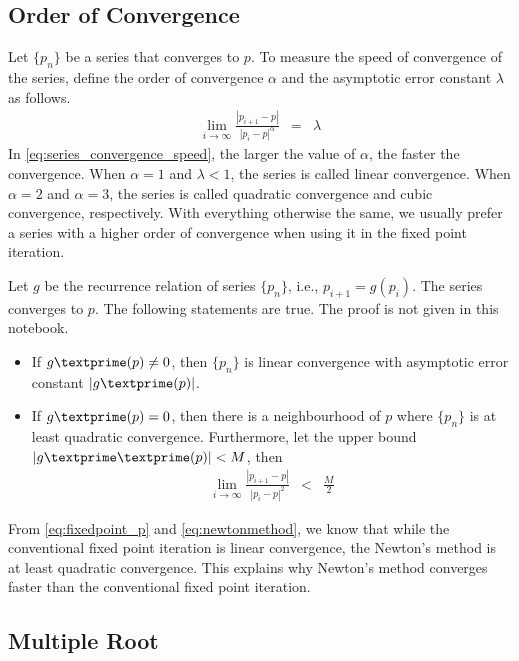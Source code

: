 \subsection{Order of Convergence}

Let $\{p_n\}$ be a series that converges to $p$. To measure the speed of convergence of the series, define the order of convergence $\alpha$ and the asymptotic error constant $\lambda$ as follows.
\begin{eqnarray}
  \lim_{i\rightarrow\infty} \frac{|p_{i+1}-p|}{|p_i-p|^\alpha} &=& \lambda \label{eq:series_convergence_speed}
\end{eqnarray}
In \eqref{eq:series_convergence_speed}, the larger the value of $\alpha$, the faster the convergence. When $\alpha=1$ and $\lambda < 1$, the series is called linear convergence. When $\alpha=2$ and $\alpha=3$, the series is called quadratic convergence and cubic convergence, respectively. With everything otherwise the same, we usually prefer a series with a higher order of convergence when using it in the fixed point iteration.

Let $g$ be the recurrence relation of series $\{p_n\}$, i.e., $p_{i+1} = g(p_i)$. The series converges to $p$. The following statements are true. The proof is not given in this notebook.
\begin{itemize}
  \item If $g\textprime(p)\neq0$, then $\{p_n\}$ is linear convergence with asymptotic error constant $|g\textprime(p)|$.
  \item If $g\textprime(p)=0$, then there is a neighbourhood of $p$ where $\{p_n\}$ is at least quadratic convergence. Furthermore, let the upper bound $|g\textprime\textprime(p)| < M$, then
  \begin{eqnarray}
  \lim_{i\rightarrow\infty} \frac{|p_{i+1}-p|}{|p_i-p|^2} &<& \frac{M}{2} \nonumber
\end{eqnarray}
\end{itemize} 


From \eqref{eq:fixedpoint_p} and \eqref{eq:newtonmethod}, we know that while the conventional fixed point iteration is linear convergence, the Newton's method is at least quadratic convergence. This explains why Newton's method converges faster than the conventional fixed point iteration.

\subsection{Multiple Root}

